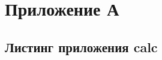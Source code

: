 

\section*{Приложение А}
\label{sec:app:listing}

\subsection*{Листинг приложения calc}
\label{sec:A}







